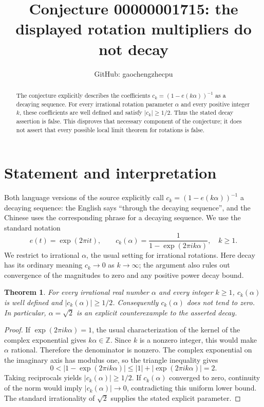 \documentclass[11pt]{article}
\title{Conjecture 00000001715: the displayed rotation multipliers do not decay}
\author{GitHub: gaochengzhecpu}
\date{}
\newtheorem{theorem}{Theorem}
\begin{document}
\maketitle
\begin{abstract}
The conjecture explicitly describes the coefficients
$c_k=(1-e(k\alpha))^{-1}$ as a decaying sequence. For every irrational
rotation parameter $\alpha$ and every positive integer $k$, these coefficients
are well defined and satisfy $|c_k|\geq 1/2$. Thus the stated decay assertion
is false. This disproves that necessary component of the conjecture; it does
not assert that every possible local limit theorem for rotations is false.
\end{abstract}

\section*{Statement and interpretation}
Both language versions of the source explicitly call
$c_k=(1-e(k\alpha))^{-1}$ a decaying sequence: the English says
``through the decaying sequence'', and the Chinese uses the corresponding
phrase for a decaying sequence. We use the standard notation
\[
 e(t)=\exp(2\pi i t),\qquad
 c_k(\alpha)=\frac{1}{1-\exp(2\pi i k\alpha)},\quad k\geq1.
\]
We restrict to irrational $\alpha$, the usual setting for irrational
rotations. Here decay has its ordinary meaning $c_k\to0$ as $k\to\infty$;
the argument also rules out convergence of the magnitudes to zero and any
positive power decay bound.

\begin{theorem}
For every irrational real number $\alpha$ and every integer $k\geq1$,
$c_k(\alpha)$ is well defined and $|c_k(\alpha)|\geq 1/2$.
Consequently $c_k(\alpha)$ does not tend to zero. In particular,
$\alpha=\sqrt2$ is an explicit counterexample to the asserted decay.
\end{theorem}
\begin{proof}
If $\exp(2\pi i k\alpha)=1$, the usual characterization of the kernel
of the complex exponential gives $k\alpha\in\mathbb Z$. Since $k$ is
a nonzero integer, this would make $\alpha$ rational. Therefore the
denominator is nonzero. The complex exponential on the imaginary axis
has modulus one, so the triangle inequality gives
\[
 0<|1-\exp(2\pi i k\alpha)|
 \leq |1|+|\exp(2\pi i k\alpha)|=2.
\]
Taking reciprocals yields $|c_k(\alpha)|\geq1/2$. If $c_k(\alpha)$
converged to zero, continuity of the norm would imply
$|c_k(\alpha)|\to0$, contradicting this uniform lower bound.
The standard irrationality of $\sqrt2$ supplies the stated explicit
parameter.
\end{proof}
\end{document}
